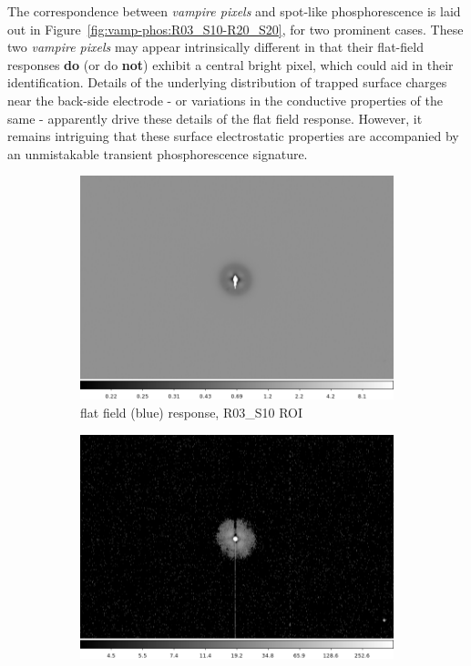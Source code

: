 

The correspondence between {\it vampire pixels} and spot-like phosphorescence is laid out in Figure~\ref{fig:vamp-phos:R03_S10-R20_S20}, for two prominent cases.  These two {\it vampire pixels} may appear intrinsically different in that their flat-field responses {\bf do} (or do {\bf not}) exhibit a central bright pixel, which could aid in their identification. Details of the underlying distribution of trapped surface charges near the back-side electrode - or variations in the conductive properties of the same - apparently drive these details of the flat field response. However, it remains intriguing that these surface electrostatic properties are accompanied by an unmistakable transient phosphorescence signature.


\begin{figure}[!htbp]
\centering
\begin{subfigure}{0.45\textwidth}
    \includegraphics[width=\textwidth]{sections/figures/phosphorescence-survey/vamp_comp_R03_S10_flatresp.png}
     \caption{flat field (blue) response, R03\_S10 ROI}
     \label{subfig:flatresp_R03_S10}
\end{subfigure}
\begin{subfigure}{0.45\textwidth}
    \includegraphics[width=\textwidth]{sections/figures/phosphorescence-survey/vamp_comp_R03_S10_phosresp.png}

\end{subfigure}
\end{figure}

